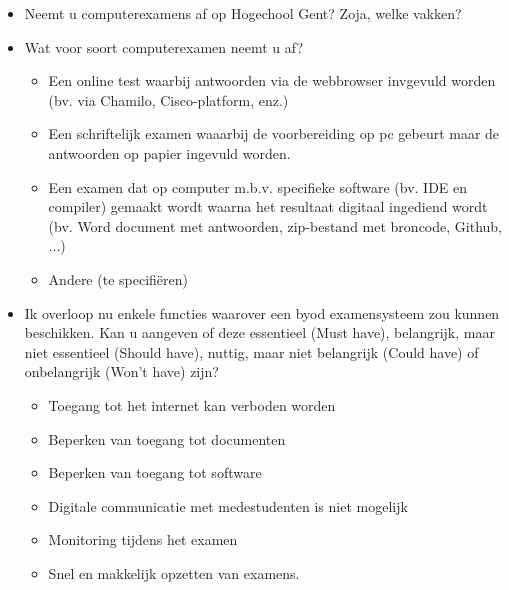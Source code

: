 \begin{itemize}
	\item Neemt u computerexamens af op Hogechool Gent? Zoja, welke vakken? 
	\bigskip 
	\item Wat voor soort computerexamen neemt u af?
	\begin{itemize}
		\item Een online test waarbij antwoorden via de webbrowser invgevuld worden (bv. via Chamilo, Cisco-platform, enz.)
		\item Een schriftelijk examen waaarbij de voorbereiding op pc gebeurt maar de antwoorden op papier ingevuld worden.
		\item Een examen dat op computer m.b.v. specifieke software (bv. IDE en compiler) gemaakt wordt waarna het resultaat digitaal ingediend wordt (bv. Word document met antwoorden, zip-bestand met broncode, Github, ...)
		\item  Andere (te specifiëren)
		
	\end{itemize}
	\bigskip 

	\item Ik overloop nu enkele functies waarover een byod examensysteem zou kunnen beschikken. Kan u aangeven of deze essentieel (Must have), belangrijk, maar niet essentieel (Should have), nuttig, maar niet belangrijk (Could have) of onbelangrijk (Won't have) zijn?
	\begin{itemize}
		\item Toegang tot het internet kan verboden worden
		\item Beperken van toegang tot documenten
		\item Beperken van toegang tot software
		\item Digitale communicatie met medestudenten is niet mogelijk
		\item Monitoring tijdens het examen
		\item Snel en makkelijk opzetten van examens. 
		

\end{itemize}
\end{itemize}
